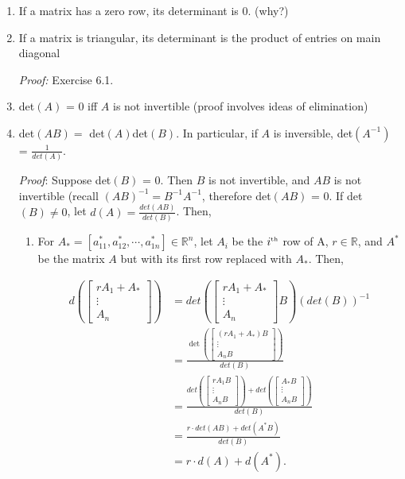 \documentclass[12pt,oneside]{article}
\begin{document}
\begin{enumerate}
\item If a matrix has a zero row, its determinant is 0. (why?)

\item If a matrix is triangular, its determinant is the product of
  entries on main diagonal

\emph{Proof:} Exercise 6.1.

\item det$(A)$ = 0 iff $A$ is not invertible (proof involves ideas of
  elimination)
\item det$(AB) = $ det$(A)$det$(B)$. In particular, if $A$ is inversible, det$(A^{-1})$ =
  $\frac{1}{det(A)}$.

\emph{Proof}: Suppose det$(B)$ = 0. Then
  $B$ is not invertible, and $AB$ is not invertible (recall $(AB)^{-1} = B^{-1}A^{-1}$, therefore det$(AB)$ = 0. If det$(B) \neq 0$, let $d(A) =
  \frac{det(AB)}{det(B)}$. Then,
\begin{enumerate}[(1)]
	\item For $A_*=[a^*_{11},  a^*_{12} , \cdots , a^*_{1n}] \in \mathbb{R}^n$, let $A_i$ be the \(i^{\text{\tiny{th}}}\) row of A,  \(r \in \mathbb{R}\), and \(A^*\)  be the matrix \(A\) but with its first row replaced with \(A_*\).  Then,


\begin{align*}
d \left(   \left[ \begin{array}{c} rA_1+A_* \\ \vdots \\ A_n \end{array} \right] \right) &= det\left(\left[ \begin{array}{c} rA_1+A_*  \\ \vdots \\ A_n \end{array} \right] B \right) (det(B))^{-1} \\
& = \frac{\det\left(\left[ \begin{array}{c} (rA_1+A_*)B  \\ \vdots \\ A_nB \end{array} \right] \right)}{det(B)} \\
&=\frac{det\left( \left[ \begin{array}{c} rA_1B  \\ \vdots \\ A_nB \end{array} \right]\right)  +  det \left(\left[ \begin{array}{c}A_*B  \\ \vdots \\ A_nB \end{array} \right] \right) }{det(B)} \\
&= \frac{ r \cdot det \left( AB\right)+ det\left( A^*B\right) }{det(B)}\\
&=r\cdot d(A)+d(A^*).
\end{align*}


\end{enumerate}
\end{enumerate}
\end{document}
